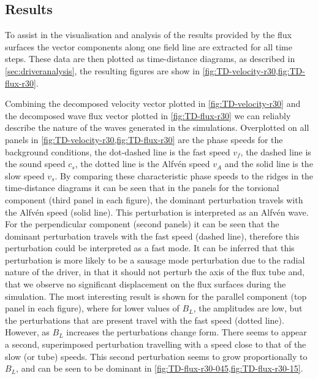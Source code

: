 \documentclass[a4paper,12pt,fourier,authoryear,custommargin]{Classes/PhDThesisPSnPDF}
\begin{document}
\subsection{Results}\label{subsec:expfac-results}

To assist in the visualisation and analysis of the results provided by the flux surfaces the vector components along one field line are extracted for all time steps.
These data are then plotted as time-distance diagrams, as described in \cref{sec:driveranalysis}, the resulting figures are show in \cref{fig:TD-velocity-r30,fig:TD-flux-r30}.

Combining the decomposed velocity vector plotted in \cref{fig:TD-velocity-r30} and the decomposed wave flux vector plotted in \cref{fig:TD-flux-r30} we can reliably describe the nature of the waves generated in the simulations.
Overplotted on all panels in \cref{fig:TD-velocity-r30,fig:TD-flux-r30} are the phase speeds for the background conditions, the dot-dashed line is the fast speed $v_f$, the dashed line is the sound speed $c_s$, the dotted line is the Alfv\'en speed $v_A$ and the solid line is the slow speed $v_s$.
By comparing these characteristic phase speeds to the ridges in the time-distance diagrams it can be seen that in the panels for the torsional component (third panel in each figure), the dominant perturbation travels with the Alfv\'en speed (solid line).
This perturbation is interpreted as an Alfv\'en wave.
For the perpendicular component (second panels) it can be seen that the dominant perturbation travels with the fast speed (dashed line), therefore this perturbation could be interpreted as a fast mode.
It can be inferred that this perturbation is more likely to be a sausage mode perturbation due to the radial nature of the driver, in that it should not perturb the axis of the flux tube and, that we observe no significant displacement on the flux surfaces during the simulation.
The most interesting result is shown for the parallel component (top panel in each figure), where for lower values of $B_L$, the amplitudes are low, but the perturbations that are present travel with the fast speed (dotted line).
However, as $B_L$ increases the perturbations change form.
There seems to appear a second, superimposed perturbation travelling with a speed close to that of the slow (or tube) speeds.
This second perturbation seems to grow proportionally to $B_L$, and can be seen to be dominant in \cref{fig:TD-flux-r30-045,fig:TD-flux-r30-15}.
\end{document}
